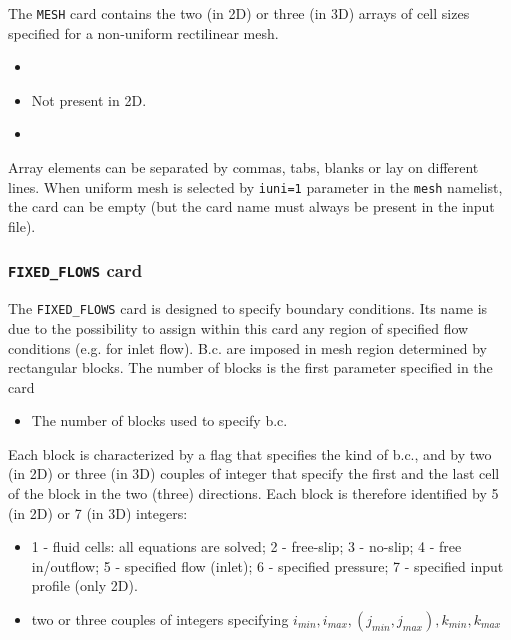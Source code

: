 The {\tt MESH} card contains the two (in 2D) or three (in 3D) arrays of cell 
sizes specified for a non-uniform rectilinear mesh. 

\begin{itemize}
\item
{}
{}

\item
{}
{Not present in 2D.}

\item
{}
{}
\end{itemize}

Array elements can be separated by commas, tabs, blanks or lay on different
lines.  When uniform mesh is selected by {\tt iuni=1} parameter in the 
{\tt mesh} namelist, the card can be empty (but the card 
name must always be present in the input file).

\subsubsection{{\tt FIXED\_FLOWS} card}

The {\tt FIXED\_FLOWS} card is designed to specify boundary conditions. Its
name is due to the possibility to assign within this card any region of
specified flow conditions (e.g. for inlet flow). B.c. are imposed in 
mesh region determined by rectangular blocks. The number of blocks is the
first parameter specified in the card

\begin{itemize}
\item
{}
{The number of blocks used to specify b.c.}
\end{itemize}

Each block is characterized
by a flag that specifies the kind of b.c., and by two (in 2D) or three (in 3D)
couples of integer that specify the first and the last cell of the block in 
the two (three) directions. Each block is therefore identified by 5 (in 2D)
or 7 (in 3D) integers:\\

\begin{itemize}
\item
{}
{1 - fluid cells: all equations are solved; 2 - free-slip;
 3 - no-slip; 4 - free in/outflow; 5 - specified flow (inlet); 
 6 - specified pressure; 7 - specified input profile (only 2D).}

\item
{}
{two or three couples of integers specifying 
$ i_{min}, i_{max}, (j_{min}, j_{max}), k_{min}, k_{max}$ }

\end{itemize}

